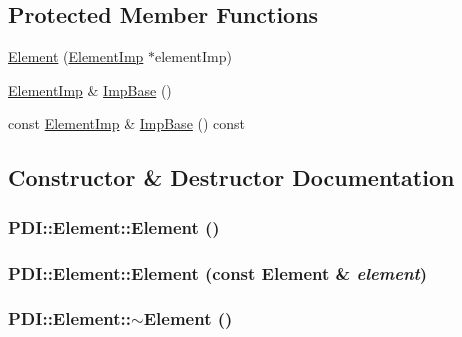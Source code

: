 \subsection*{Protected Member Functions}
\begin{CompactItemize}
\item 
\hyperlink{class_p_d_i_1_1_element_6e6bc482dd5780a39acb49571be1ae82}{Element} (\hyperlink{class_p_d_i_1_1_element_imp}{ElementImp} $\ast$elementImp)
\item 
\hyperlink{class_p_d_i_1_1_element_imp}{ElementImp} \& \hyperlink{class_p_d_i_1_1_element_c4724e42d490ba55df98452fb73b2866}{ImpBase} ()
\item 
const \hyperlink{class_p_d_i_1_1_element_imp}{ElementImp} \& \hyperlink{class_p_d_i_1_1_element_6cd07b6afc2c4b809a830f54aff4e96c}{ImpBase} () const 
\end{CompactItemize}


\subsection{Constructor \& Destructor Documentation}
\hypertarget{class_p_d_i_1_1_element_8bff5e34dcb706745872315786d889fe}{
\subsubsection[{Element}]{\setlength{\rightskip}{0pt plus 5cm}PDI::Element::Element ()}}
\label{class_p_d_i_1_1_element_8bff5e34dcb706745872315786d889fe}


\hypertarget{class_p_d_i_1_1_element_caebee3e6095bd9bddba580b566ed2c7}{
\subsubsection[{Element}]{\setlength{\rightskip}{0pt plus 5cm}PDI::Element::Element (const {\bf Element} \& {\em element})}}
\label{class_p_d_i_1_1_element_caebee3e6095bd9bddba580b566ed2c7}


\hypertarget{class_p_d_i_1_1_element_5135cae2be5dda47271fd004bc4a1b4e}{
\subsubsection[{$\sim$Element}]{\setlength{\rightskip}{0pt plus 5cm}PDI::Element::$\sim$Element ()}}
\label{class_p_d_i_1_1_element_5135cae2be5dda47271fd004bc4a1b4e}


